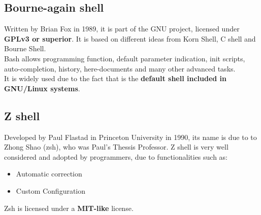 \documentclass[11pt]{article}
\begin{document}
\subsection{Bourne-again shell}
Written by Brian Fox in 1989, it is part of the GNU project, licensed under \textbf{GPLv3 or superior}. It is based on different ideas from Korn Shell, C shell and Bourne Shell.\\
Bash allows programming function, default parameter indication, init scripts, auto-completion, history, here-documents and many other advanced tasks.\\
It is widely used due to the fact that is the \textbf{default shell included in GNU/Linux systems}.
\subsection{Z shell}
Developed by Paul Flastad in Princeton University in 1990, its name is due to to Zhong Shao (zsh), who was Paul's Thessis Professor. Z shell is very well considered and adopted by programmers, due to functionalities such as:
\begin{itemize}\itemsep0pt
\item{Automatic correction}
\item{Custom Configuration}
\end{itemize}
Zsh is licensed under a \textbf{MIT-like} license.
\end{document}
